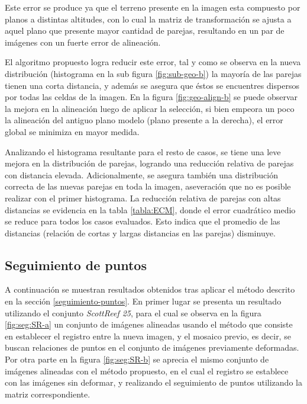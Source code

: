 Este error se produce ya que el terreno presente en la imagen esta compuesto por planos a distintas altitudes, con lo cual la matriz de transformación se ajusta a aquel plano que presente mayor cantidad de parejas, resultando en un par de imágenes con un fuerte error de alineación. 

El algoritmo propuesto logra reducir este error, tal y como se observa en la nueva distribución (histograma en la sub figura \ref{fig:sub-geo-b}) la mayoría de las parejas tienen una corta distancia, y además se asegura que éstos se encuentres dispersos por todas las celdas de la imagen. En la figura \ref{fig:geo-align-b} se puede observar la mejora en la alineación luego de aplicar la selección, si bien empeora un poco la alineación del antiguo plano modelo (plano presente a la derecha), el error global se minimiza en mayor medida. 

Analizando el histograma resultante para el resto de casos, se tiene una leve mejora en la distribución de parejas, logrando una reducción relativa de parejas con distancia elevada. Adicionalmente, se asegura también una distribución correcta de las nuevas parejas en toda la imagen, aseveración que no es posible realizar con el primer histograma. La reducción relativa de parejas con altas distancias se evidencia en la tabla \ref{tabla:ECM}, donde el error cuadrático medio se reduce para todos los casos evaluados. Esto indica que el promedio de las distancias (relación de cortas y largas distancias en las parejas) disminuye.

\subsection*{Seguimiento de puntos}

A continuación se muestran resultados obtenidos tras aplicar el método descrito en la sección \ref{seguimiento-puntos}. En primer lugar se presenta un resultado utilizando el conjunto \textit{ScottReef 25}, para el cual se observa en la figura \ref{fig:seg:SR-a} un conjunto de imágenes alineadas usando el método que consiste en establecer el registro entre la nueva imagen, y el mosaico previo, es decir, se buscan relaciones de puntos en el conjunto de imágenes previamente deformadas. Por otra parte en la figura \ref{fig:seg:SR-b} se aprecia el mismo conjunto de imágenes alineadas con el método propuesto, en el cual el registro se establece con las imágenes sin deformar, y realizando el seguimiento de puntos utilizando la matriz correspondiente.

